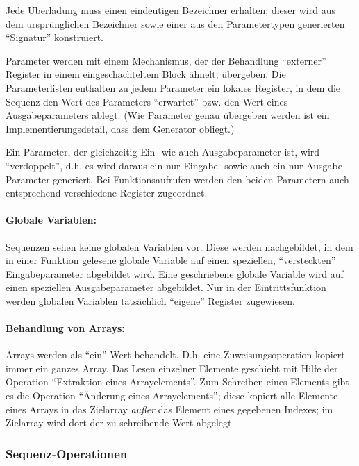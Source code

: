 \documentclass[twoside,a4paper,fleqn,12pt]{article}
\begin{document}
Jede Überladung muss einen eindeutigen Bezeichner erhalten; dieser wird aus dem ursprünglichen Bezeichner
sowie einer aus den Parametertypen generierten "`Signatur"' konstruiert.

Parameter werden mit einem Mechanismus, der der Behandlung "`externer"' Register in einem eingeschachteltem
Block ähnelt, übergeben. Die Parameterlisten enthalten zu jedem Parameter ein lokales Register, in dem die
Sequenz den Wert des Parameters "`erwartet"' bzw. den Wert eines Ausgabeparameters ablegt.
(Wie Parameter genau übergeben werden ist ein Implementierungsdetail, dass dem Generator obliegt.)

Ein Parameter, der gleichzeitig Ein- wie auch Ausgabeparameter ist, wird "`verdoppelt"', d.h. es wird daraus
ein nur-Eingabe- sowie auch ein nur-Ausgabe-Parameter generiert. Bei Funktionsaufrufen werden den beiden
Parametern auch entsprechend verschiedene Register zugeordnet.

\paragraph{Globale Variablen:}
Sequenzen sehen keine globalen Variablen vor. Diese werden nachgebildet, in dem in einer Funktion gelesene globale Variable
auf einen speziellen, "`versteckten"' Eingabeparameter abgebildet wird. Eine geschriebene globale Variable wird
auf einen speziellen Ausgabeparameter abgebildet. Nur in der Eintrittsfunktion werden globalen Variablen tatsächlich
"`eigene"' Register zugewiesen.



\paragraph{Behandlung von Arrays:}
Arrays werden als "`ein"' Wert behandelt. D.h. eine Zuweisungsoperation kopiert immer ein ganzes Array.
Das Lesen einzelner Elemente geschieht mit Hilfe der Operation "`Extraktion eines Arrayelements"'.
Zum Schreiben eines Elements gibt es die Operation "`Änderung eines Arrayelements"'; diese kopiert alle Elemente
eines Arrays in das Zielarray \emph{außer} das Element eines gegebenen Indexes; im Zielarray wird dort der zu
schreibende Wert abgelegt.

\subsubsection{Sequenz-Operationen}
\end{document}
